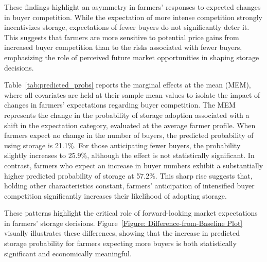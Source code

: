 These findings highlight an asymmetry in farmers' responses to expected changes in buyer competition. While the expectation of more intense competition strongly incentivizes storage, expectations of fewer buyers do not significantly deter it. This suggests that farmers are more sensitive to potential price gains from increased buyer competition than to the risks associated with fewer buyers, emphasizing the role of perceived future market opportunities in shaping storage decisions.

Table~\ref{tab:predicted_probs} reports the marginal effects at the mean (MEM), where all covariates are held at their sample mean values to isolate the impact of changes in farmers' expectations regarding buyer competition. The MEM represents the change in the probability of storage adoption associated with a shift in the expectation category, evaluated at the average farmer profile. When farmers expect no change in the number of buyers, the predicted probability of using storage is 21.1\%. For those anticipating fewer buyers, the probability slightly increases to 25.9\%, although the effect is not statistically significant. In contrast, farmers who expect an increase in buyer numbers exhibit a substantially higher predicted probability of storage at 57.2\%. This sharp rise suggests that, holding other characteristics constant, farmers' anticipation of intensified buyer competition significantly increases their likelihood of adopting storage.

These patterns highlight the critical role of forward-looking market expectations in farmers' storage decisions. Figure~\ref{Figure: Difference-from-Baseline Plot} visually illustrates these differences, showing that the increase in predicted storage probability for farmers expecting more buyers is both statistically significant and economically meaningful.




